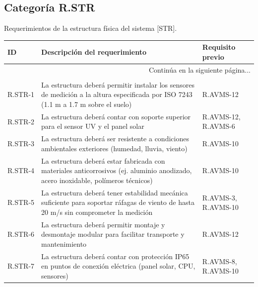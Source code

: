 \documentclass{article}%
\begin{document}
\subsection{Categoría R.STR}%
\label{subsec:CategoraR.STR}%
Requerimientos de la estructura física del sistema [STR].\newline%
\newline%
%
\begin{longtable}{|p{2cm}|p{9cm}|p{2.5cm}|}%
\hline%
ID&Descripción del requerimiento&Requisito previo\\%
\hline%
\endhead%
\hline%
\multicolumn{3}{|r|}{Continúa en la siguiente página...}\\%
\hline%
\endfoot%
\hline%
\multicolumn{3}{|r|}{Fin de la tabla}\\%
\hline%
\endlastfoot%
R.STR{-}1& La estructura deberá permitir instalar los sensores de medición a la altura especificada por ISO 7243 (1.1 m a 1.7 m sobre el suelo)& R.AVMS{-}12\\%
\hline%
R.STR{-}2& La estructura deberá contar con soporte superior para el sensor UV y el panel solar& R.AVMS{-}12, R.AVMS{-}6\\%
\hline%
R.STR{-}3& La estructura deberá ser resistente a condiciones ambientales exteriores (humedad, lluvia, viento)& R.AVMS{-}10\\%
\hline%
R.STR{-}4& La estructura deberá estar fabricada con materiales anticorrosivos (ej. aluminio anodizado, acero inoxidable, polímeros técnicos)& R.AVMS{-}10\\%
\hline%
R.STR{-}5& La estructura deberá tener estabilidad mecánica suficiente para soportar ráfagas de viento de hasta 20 m/s sin comprometer la medición& R.AVMS{-}3, R.AVMS{-}10\\%
\hline%
R.STR{-}6& La estructura deberá permitir montaje y desmontaje modular para facilitar transporte y mantenimiento& R.AVMS{-}12\\%
\hline%
R.STR{-}7& La estructura deberá contar con protección IP65 en puntos de conexión eléctrica (panel solar, CPU, sensores)& R.AVMS{-}8, R.AVMS{-}10\\%
\hline%
\end{longtable}

%
\newpage%
\end{document}
